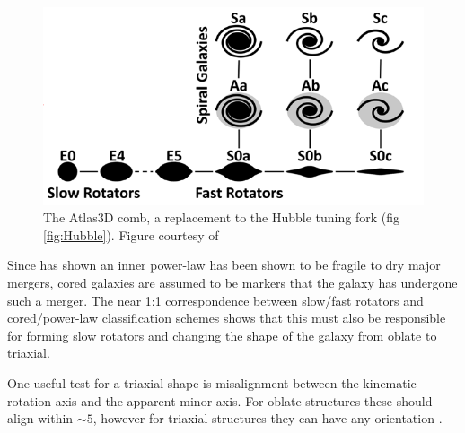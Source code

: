 	\begin{figure}
		\centering
		\includegraphics[width=\textwidth]{introduction/Atlas3D_comb.png}
		\caption[The Atlas3D comb]{The Atlas3D comb, a replacement to the Hubble tuning fork (fig \ref{fig:Hubble}). Figure courtesy of \citet{Cappellari2011a}}
		\label{fig:Atlas3Dcomb}
	\end{figure}

	Since \citet{Sarzi2015} has shown an inner power-law has been shown to be fragile to dry major mergers, cored galaxies are assumed to be markers that the galaxy has undergone such a merger. The near 1:1 correspondence between slow/fast rotators and cored/power-law classification schemes shows that this must also be responsible for forming slow rotators and changing the shape of the galaxy from oblate to triaxial.

	One useful test for a triaxial shape is misalignment between the kinematic rotation axis and the apparent minor axis. For oblate structures these should align within $\sim 5$\textdegree, however for triaxial structures they can have any orientation \citep{Contopoulos1956, Stark1977, Statler1987}. 

